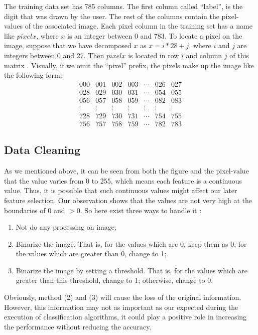 \documentclass[sigconf]{acmart}
\begin{document}
The training data set has 785 columns. The first column called ``label'', is the digit that was drawn by the user. The rest of the columns contain the pixel-values of the associated image. Each pixel column in the training set has a name like $pixelx$, where $x$ is an integer between 0 and 783. To locate a pixel on the image, suppose that we have decomposed $x$ as $x=i*28+j$, where $i$ and $j$ are integers between 0 and 27. Then $pixelx$ is located in row $i$ and column $j$ of this matrix \cite{kaggle}. Visually, if we omit the ``pixel'' prefix, the pixels make up the image like the following form:
$$
  \begin{matrix}
   000 & 001 & 002 & 003 & \cdots & 026 & 027 \\
   028 & 029 & 030 & 031 & \cdots & 054 & 055 \\
   056 & 057 & 058 & 059 & \cdots & 082 & 083 \\
   \vdots & \vdots & \vdots & \vdots & \vdots & \vdots & \vdots \\
   728 & 729 & 730 & 731 & \cdots & 754 & 755 \\
   756 & 757 & 758 & 759 & \cdots & 782 & 783
  \end{matrix}
$$

\subsection{Data Cleaning}

As we mentioned above, it can be seen from both the figure and the pixel-value that the value varies from 0 to 255, which means each feature is a continuous value. Thus, it is possible that such continuous values might affect our later feature selection. Our observation shows that the values are not very high at the boundaries of 0 and $>0$. So here exist three ways to handle it \cite{data_clean}:
\begin{enumerate}
    \item Not do any processing on image;
    \item Binarize the image. That is, for the values which are 0, keep them as 0; for the values which are greater than 0, change to 1;
    \item Binarize the image by setting a threshold. That is, for the values which are greater than this threshold, change to 1; otherwise, change to 0.
\end{enumerate}

Obviously, method (2) and (3) will cause the loss of the original information. However, this information may not as important as our expected during the execution of classification algorithms, it could play a positive role in increasing the performance without reducing the accuracy.
\end{document}
